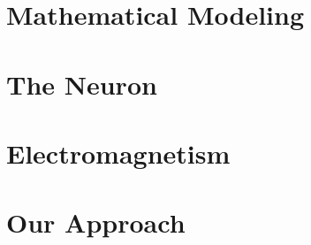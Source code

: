 \documentclass[../Orator.tex]{subfiles}
\begin{document}
\chapter{Mathematical Modeling}


\chapter{The Neuron}


\chapter{Electromagnetism}



\chapter{Our Approach}

\end{document}
